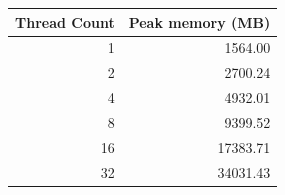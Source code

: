 \begin{tabular}{rr}
\toprule
Thread Count & Peak memory (MB) \\
\midrule
1 & 1564.00 \\
2 & 2700.24 \\
4 & 4932.01 \\
8 & 9399.52 \\
16 & 17383.71 \\
32 & 34031.43 \\
\bottomrule
\end{tabular}
